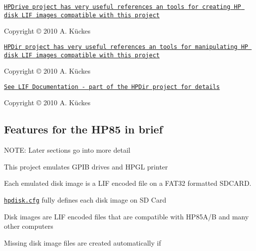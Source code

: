\begin{DoxyItemize}
\item \href{http://www.hp9845.net/9845/projects/hpdrive}{\tt H\+P\+Drive project has very useful references an tools for creating HP disk L\+IF images compatible with this project}
\begin{DoxyItemize}
\item Copyright © 2010 A. Kückes
\end{DoxyItemize}
\item \href{http://www.hp9845.net/9845/projects/hpdrive}{\tt H\+P\+Dir project has very useful references an tools for manipulating HP disk L\+IF images compatible with this project}
\begin{DoxyItemize}
\item Copyright © 2010 A. Kückes
\end{DoxyItemize}
\item \href{http://www.hp9845.net/9845/projects/hpdir/#lif_filesystem}{\tt See L\+IF Documentation -\/ part of the H\+P\+Dir project for details}
\begin{DoxyItemize}
\item Copyright © 2010 A. Kückes
\end{DoxyItemize}
\end{DoxyItemize}

\subsection*{Features for the H\+P85 in brief}


\begin{DoxyItemize}
\item N\+O\+TE\+: Later sections go into more detail
\item This project emulates G\+P\+IB drives and H\+P\+GL printer
\begin{DoxyItemize}
\item Each emulated disk image is a L\+IF encoded file on a F\+A\+T32 formatted S\+D\+C\+A\+RD.
\end{DoxyItemize}
\end{DoxyItemize}

\href{sdcard/hpdisk.cfg}{\tt hpdisk.\+cfg} fully defines each disk image on SD Card
\begin{DoxyItemize}
\item Disk images are L\+IF encoded files that are compatible with H\+P85\+A/B and many other computers
\item Missing disk image files are created automatically if
\end{DoxyItemize}

